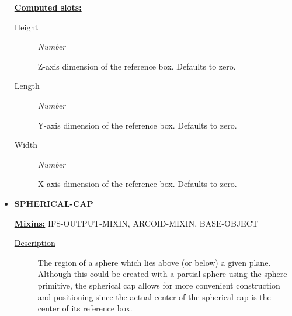 \documentclass [11pt]{book}
\begin{document}
\begin{itemize}
\textbf{
\underline{Computed slots:}}

\begin{description}

\item [Height]
\emph{Number}

 Z-axis dimension of the reference box. Defaults to zero.




\item [Length]
\emph{Number}

 Y-axis dimension of the reference box. Defaults to zero.




\item [Width]
\emph{Number}

 X-axis dimension of the reference box. Defaults to zero.




\end{description}







\item {}
\label{prim:spherical-cap}
\textbf{SPHERICAL-CAP}


\textbf{
\underline{Mixins:}} IFS-OUTPUT-MIXIN, ARCOID-MIXIN, BASE-OBJECT





\begin{description}

\item [
\underline{Description}]


The region of a sphere which lies above (or below) a given plane. Although this
could be created with a partial sphere using the sphere primitive, the spherical cap allows for more convenient
construction and positioning since the actual center of the spherical cap is the center of its reference box.



\end{description}




\begin{figure}
\begin{lrbox}{\boxedverb}
\begin{minipage}{\linewidth}
{\small

\begin{verbatim}
  

\end{verbatim}}
\end{minipage}
\end{lrbox}
\end{figure}
\end{itemize}
\end{document}
